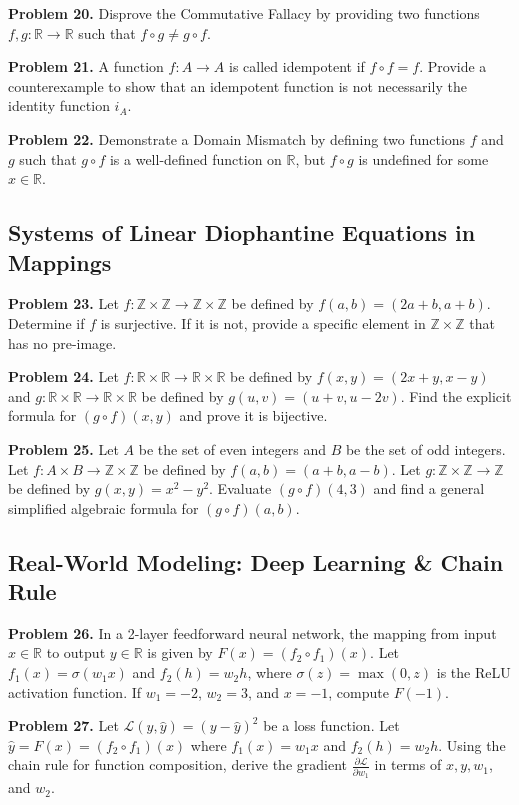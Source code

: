 \documentclass[11pt, letterpaper]{article}
\theoremstyle{definition}
\theoremstyle{remark}
\newcommand{\R}{\mathbb{R}}
\newcommand{\Z}{\mathbb{Z}}
\begin{document}
\textbf{Problem 20.} Disprove the Commutative Fallacy by providing two functions $f, g: \R \to \R$ such that $f \circ g \neq g \circ f$.

\textbf{Problem 21.} A function $f: A \to A$ is called idempotent if $f \circ f = f$. Provide a counterexample to show that an idempotent function is not necessarily the identity function $i_A$.

\textbf{Problem 22.} Demonstrate a Domain Mismatch by defining two functions $f$ and $g$ such that $g \circ f$ is a well-defined function on $\R$, but $f \circ g$ is undefined for some $x \in \R$.

\subsection{Systems of Linear Diophantine Equations in Mappings}

\textbf{Problem 23.} Let $f: \Z \times \Z \to \Z \times \Z$ be defined by $f(a, b) = (2a + b, a + b)$. Determine if $f$ is surjective. If it is not, provide a specific element in $\Z \times \Z$ that has no pre-image.

\textbf{Problem 24.} Let $f: \R \times \R \to \R \times \R$ be defined by $f(x, y) = (2x + y, x - y)$ and $g: \R \times \R \to \R \times \R$ be defined by $g(u, v) = (u + v, u - 2v)$. Find the explicit formula for $(g \circ f)(x, y)$ and prove it is bijective.

\textbf{Problem 25.} Let $A$ be the set of even integers and $B$ be the set of odd integers. Let $f: A \times B \to \Z \times \Z$ be defined by $f(a, b) = (a + b, a - b)$. Let $g: \Z \times \Z \to \Z$ be defined by $g(x, y) = x^2 - y^2$. Evaluate $(g \circ f)(4, 3)$ and find a general simplified algebraic formula for $(g \circ f)(a, b)$.

\subsection{Real-World Modeling: Deep Learning \& Chain Rule}

\textbf{Problem 26.} In a 2-layer feedforward neural network, the mapping from input $x \in \R$ to output $y \in \R$ is given by $F(x) = (f_2 \circ f_1)(x)$. Let $f_1(x) = \sigma(w_1 x)$ and $f_2(h) = w_2 h$, where $\sigma(z) = \max(0, z)$ is the ReLU activation function. If $w_1 = -2$, $w_2 = 3$, and $x = -1$, compute $F(-1)$.

\textbf{Problem 27.} Let $\mathcal{L}(y, \hat{y}) = (y - \hat{y})^2$ be a loss function. Let $\hat{y} = F(x) = (f_2 \circ f_1)(x)$ where $f_1(x) = w_1 x$ and $f_2(h) = w_2 h$. Using the chain rule for function composition, derive the gradient $\frac{\partial \mathcal{L}}{\partial w_1}$ in terms of $x, y, w_1$, and $w_2$.
\end{document}
